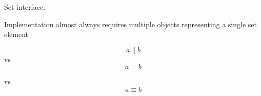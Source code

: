 
Set interface.

Implementation almost always requires multiple objects
representing a single set element

\begin{equation}
a \parallel b
\end{equation}
vs
\begin{equation}
a = b
\end{equation}

vs
\begin{equation}
a \equiv b
\end{equation}

%   
%   
% 
% 
% 
% 
% 
% 
 
